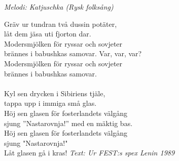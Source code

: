{\footnotesize\textit{Melodi: Katjuschka (Rysk folksång)}}\par
\vspace{10pt}
\par
Gräv ur tundran två dussin potäter,\\
låt dem jäsa uti fjorton dar.\\
Modersmjölken för ryssar och sovjeter\\
brännes i babushkas samovar. Var, var, var?\\
Modersmjölken för ryssar och sovjeter\\
brännes i babushkas samovar.\\
\\
Kyl sen drycken i Sibiriens tjäle,\\
tappa upp i immiga små glas.\\
Höj sen glasen för fosterlandets välgång\\
sjung ”Nastarovnja!” med en mäktig bas.\\
Höj sen glasen för fosterlandets välgång\\
sjung "Nastarovnja!" \\
Låt glasen gå i kras!
\vspace{10pt}
{\footnotesize\textit{Text: Ur FEST:s spex Lenin 1989}}
